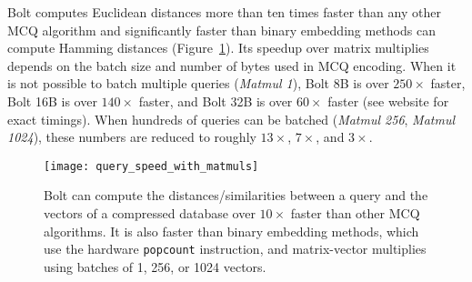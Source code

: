 Bolt computes Euclidean distances more than ten times faster than any other MCQ algorithm and significantly faster than binary embedding methods can compute Hamming distances (Figure~\ref{fig:query_speeds}). Its speedup over matrix multiplies depends on the batch size and number of bytes used in MCQ encoding. When it is not possible to batch multiple queries (\textit{Matmul 1}), Bolt 8B is over $250\times$ faster, Bolt 16B is over $140\times$ faster, and Bolt 32B is over $60\times$ faster (see website for exact timings). When hundreds of queries can be batched (\textit{Matmul 256}, \textit{Matmul 1024}), these numbers are reduced to roughly $13\times$, $7\times$, and $3\times$.



\begin{figure}[h]
\begin{center}
\texttt{[image: query\_speed\_with\_matmuls]}
\caption{Bolt can compute the distances/similarities between a query and the vectors of a compressed database over $10\times$ faster than other MCQ algorithms. It is also faster than binary embedding methods, which use the hardware \texttt{popcount} instruction, and matrix-vector multiplies using batches of 1, 256, or 1024 vectors.}
\label{fig:query_speeds}
\end{center}
\end{figure}

